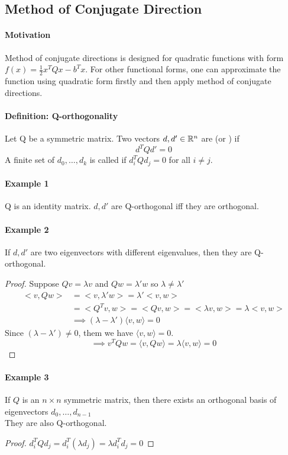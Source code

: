 \documentclass[11pt]{article}
\begin{document}
\subsection{Method of Conjugate Direction}
\paragraph{Motivation}
Method of conjugate directions is designed for quadratic functions with form $f(x) = \frac{1}{2}x^TQx - b^Tx$. For other functional forms, one can approximate the function using quadratic form firstly and then apply method of conjugate directions.

\paragraph{Definition: Q-orthogonality}
Let Q be a symmetric matrix. Two vectors $d, d' \in \mathbb{R}^n$ are  (or ) if $$d^TQd' = 0$$
A finite set of $d_0, \hdots, d_k$ is called  if $d_i^TQd_j = 0$ for all $i \neq j$.

\paragraph{Example 1}
Q is an identity matrix. $d, d'$ are Q-orthogonal iff they are orthogonal.

\paragraph{Example 2}
If $d, d'$ are two eigenvectors with different eigenvalues, then they are Q-orthogonal. \\
\begin{proof}
Suppose $Qv = \lambda v$ and $Qw = \lambda' w$ so $\lambda \neq \lambda'$
	\begin{align}
		<v, Qw> &= <v, \lambda'w> = \lambda'<v,w> \\
		&= <Q^Tv, w> = <Qv, w> = <\lambda v, w> = \lambda <v,w>\\
		&\implies (\lambda - \lambda')\langle v, w \rangle  = 0
	\end{align}
	Since $(\lambda - \lambda') \neq 0$, them we have $\langle v, w \rangle  = 0$.
	$$\implies v^TQw = \langle v, Qw \rangle = \lambda \langle v, w \rangle  = 0$$
\end{proof}

\paragraph{Example 3}
If $Q$ is an $n \times n$ symmetric matrix, then there exists an orthogonal basis of eigenvectors $d_0, \hdots, d_{n-1}$ \\
 They are also Q-orthogonal. \\
\begin{proof}
	$d_i^TQd_j = d_i^T(\lambda d_j) = \lambda d_i^Td_j = 0$ 
\end{proof}
\end{document}

